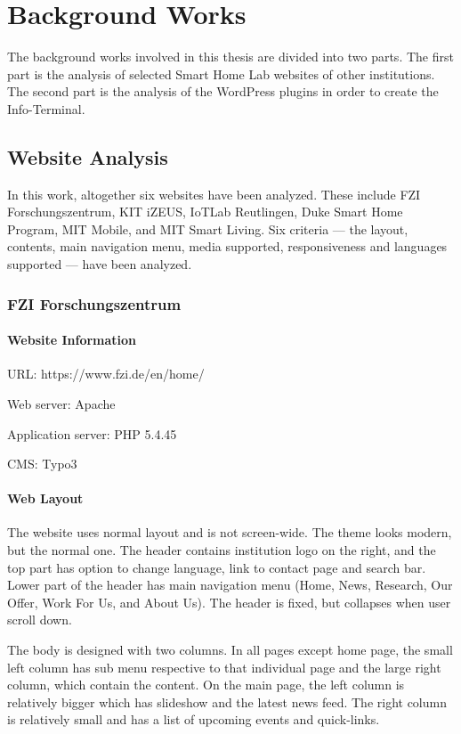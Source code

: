 \chapter{Background Works}
The background works involved in this thesis are divided into two parts. The first part is the analysis of selected Smart Home Lab websites of other institutions. The second part is the analysis of the WordPress plugins in order to create the Info-Terminal.

\section{Website Analysis}
In this work, altogether six websites have been analyzed. These include FZI Forschungszentrum, KIT iZEUS, IoTLab Reutlingen, Duke Smart Home Program, MIT Mobile, and MIT Smart Living. Six criteria --- the layout, contents, main navigation menu, media supported, responsiveness and languages supported --- have been analyzed.

\subsection{FZI Forschungszentrum}

\subsubsection*{Website Information}
\begin{itemize*}
\item URL: https://www.fzi.de/en/home/
\item Web server: Apache
\item Application server: PHP 5.4.45
\item CMS: Typo3
\end{itemize*}

\subsubsection*{Web Layout}
The website \cite{fzi-2017} uses normal layout and is not screen-wide. The theme looks modern, but the normal one. The header contains institution logo on the right, and the top part has option to change language, link to contact page and search bar. Lower part of the header has main navigation menu (Home, News, Research, Our Offer, Work For Us, and About Us). The header is fixed, but collapses when user scroll down.

The body is designed with two columns. In all pages except home page, the small left column has sub menu respective to that individual page and the large right column, which contain the content. On the main page, the left column is relatively bigger which has slideshow and the latest news feed. The right column is relatively small and has a list of upcoming events and quick-links.


